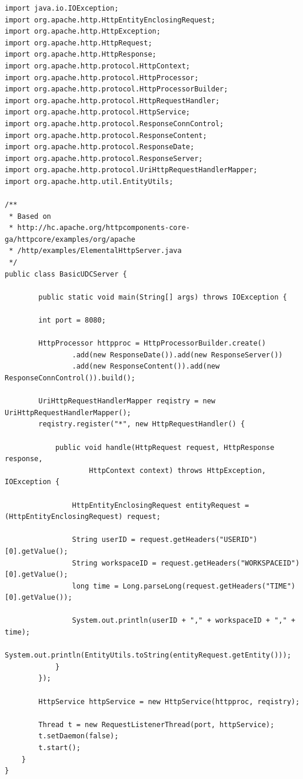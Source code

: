\begin{lstlisting}
import java.io.IOException;
import org.apache.http.HttpEntityEnclosingRequest;
import org.apache.http.HttpException;
import org.apache.http.HttpRequest;
import org.apache.http.HttpResponse;
import org.apache.http.protocol.HttpContext;
import org.apache.http.protocol.HttpProcessor;
import org.apache.http.protocol.HttpProcessorBuilder;
import org.apache.http.protocol.HttpRequestHandler;
import org.apache.http.protocol.HttpService;
import org.apache.http.protocol.ResponseConnControl;
import org.apache.http.protocol.ResponseContent;
import org.apache.http.protocol.ResponseDate;
import org.apache.http.protocol.ResponseServer;
import org.apache.http.protocol.UriHttpRequestHandlerMapper;
import org.apache.http.util.EntityUtils;

/**
 * Based on
 * http://hc.apache.org/httpcomponents-core-ga/httpcore/examples/org/apache
 * /http/examples/ElementalHttpServer.java
 */
public class BasicUDCServer {

		public static void main(String[] args) throws IOException {

		int port = 8080;

		HttpProcessor httpproc = HttpProcessorBuilder.create()
				.add(new ResponseDate()).add(new ResponseServer())
				.add(new ResponseContent()).add(new ResponseConnControl()).build();

		UriHttpRequestHandlerMapper reqistry = new UriHttpRequestHandlerMapper();
		reqistry.register("*", new HttpRequestHandler() {

			public void handle(HttpRequest request, HttpResponse response,
					HttpContext context) throws HttpException, IOException {

				HttpEntityEnclosingRequest entityRequest = (HttpEntityEnclosingRequest) request;

				String userID = request.getHeaders("USERID")[0].getValue();
				String workspaceID = request.getHeaders("WORKSPACEID")[0].getValue();
				long time = Long.parseLong(request.getHeaders("TIME")[0].getValue());

				System.out.println(userID + "," + workspaceID + "," + time);
				System.out.println(EntityUtils.toString(entityRequest.getEntity()));
			}
		});

		HttpService httpService = new HttpService(httpproc, reqistry);

		Thread t = new RequestListenerThread(port, httpService);
		t.setDaemon(false);
		t.start();
	}
}
\end{lstlisting}

